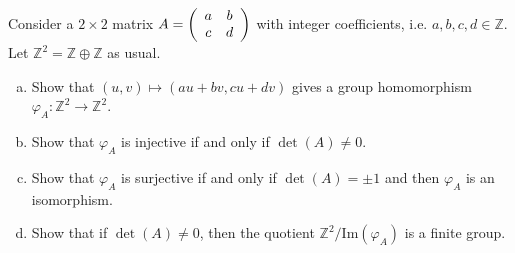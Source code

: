 \documentclass{article}
\newcounter{Problem}
\newenvironment{Problem}{\begin{Exercise}[name={Problem},
                                          counter={Problem}]}
                        {\end{Exercise}}
\begin{document}
\pagebreak

\begin{Problem}
Consider a $2 \times 2$ matrix
$A = \left(\begin{array}{c c}
       a & b \\ c & d
     \end{array}\right)$
with integer coefficients, i.e.
$a, b, c, d \in \mathbb{Z}$. Let
$\mathbb{Z}^2 = \mathbb{Z} \oplus \mathbb{Z}$ as usual.
\begin{enumerate}[(a)]
  \item{
    Show that $(u, v) \mapsto (au + bv, cu + dv)$ gives a group
    homomorphism $\varphi_A : \mathbb{Z}^2 \to \mathbb{Z}^2$.
  }
  \item{
    Show that $\varphi_A$ is injective if and only if
    $\det(A) \neq 0$.
  }
  \item{
    Show that $\varphi_A$ is surjective if and only if
    $\det(A) = \pm 1$ and then $\varphi_A$ is an isomorphism.
  }
  \item{
    Show that if $\det(A) \neq 0$, then the quotient
    $\mathbb{Z}^2 / \mathrm{Im}(\varphi_A)$ is a finite group.
  }
\end{enumerate}
\end{Problem}
\end{document}
